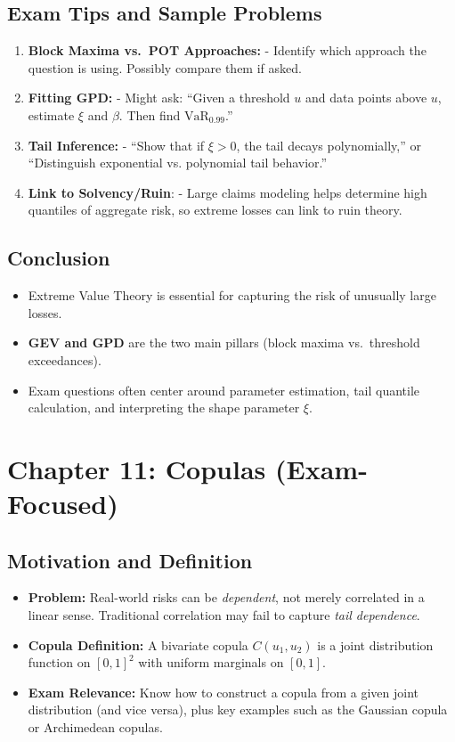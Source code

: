\documentclass[13pt,a4paper]{article}
\begin{document}
\subsection{Exam Tips and Sample Problems}
\begin{enumerate}
  \item \textbf{Block Maxima vs.\ POT Approaches:} 
    - Identify which approach the question is using. Possibly compare them if asked.
  \item \textbf{Fitting GPD:} 
    - Might ask: “Given a threshold \(u\) and data points above \(u\), estimate \(\xi\) and \(\beta\). Then find \(\mathrm{VaR}_{0.99}\).”
  \item \textbf{Tail Inference:} 
    - “Show that if \(\xi>0\), the tail decays polynomially,” or “Distinguish exponential vs. polynomial tail behavior.”
  \item \textbf{Link to Solvency/Ruin}: 
    - Large claims modeling helps determine high quantiles of aggregate risk, so extreme losses can link to ruin theory.
\end{enumerate}

\subsection{Conclusion}
\begin{itemize}
  \item Extreme Value Theory is essential for capturing the risk of unusually large losses.
  \item \textbf{GEV and GPD} are the two main pillars (block maxima vs.\ threshold exceedances).
  \item Exam questions often center around parameter estimation, tail quantile calculation, and interpreting the shape parameter \(\xi\).
\end{itemize}

\section{Chapter 11: Copulas (Exam-Focused)}
\label{sec:chapter11}

\subsection{Motivation and Definition}
\begin{itemize}
  \item \textbf{Problem:} Real-world risks can be \emph{dependent}, not merely correlated in a linear sense. Traditional correlation may fail to capture \emph{tail dependence}.
  \item \textbf{Copula Definition:} 
    A bivariate copula \(C(u_1, u_2)\) is a joint distribution function on \([0,1]^2\) with uniform marginals on \([0,1]\).
  \item \textbf{Exam Relevance:} Know how to construct a copula from a given joint distribution (and vice versa), plus key examples such as the Gaussian copula or Archimedean copulas.
\end{itemize}
\end{document}
